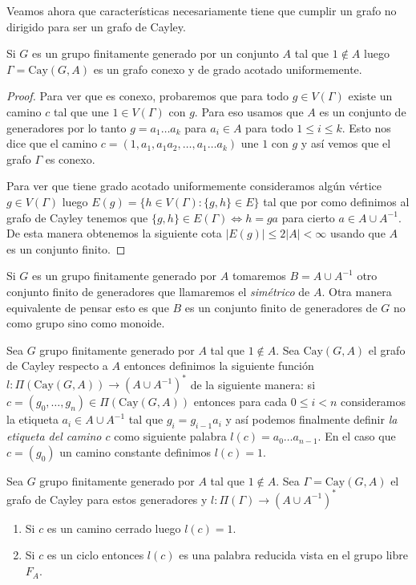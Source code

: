 \documentclass[tesis.tex]{subfiles}
\begin{document}
Veamos ahora que características necesariamente tiene que cumplir un grafo no dirigido para ser un grafo de Cayley.

\begin{lema}\label{lema_cayley_conexo_grado}
	Si $G$ es un grupo finitamente generado por un conjunto $A$ tal que $1 \notin A$ luego $\Gamma = \text{Cay}(G,A)$ es un grafo conexo y de grado acotado uniformemente.
\end{lema}
\begin{proof}
	Para ver que es conexo,	probaremos que para todo $g \in V(\Gamma)$ existe un camino $c$ tal que une $1 \in V(\Gamma)$ con $g$.
	Para eso usamos que $A$ es un conjunto de generadores por lo tanto $g = a_{1} \dots a_{k}$ para $a_{i} \in A$ para todo $1 \le i \le k$.
	Esto nos dice que el camino $c = (1, a_{1}, a_{1}a_{2}, \dots, a_{1} \dots a_{k})$ une $1$ con $g$ y así vemos que el grafo $\Gamma$ es conexo. 
	
	Para ver que tiene grado acotado uniformemente consideramos algún vértice $g \in V(\Gamma)$ luego $E(g) = \{  h \in V(\Gamma) : \{g,h\} \in E \}$ tal que por como definimos al grafo de Cayley tenemos que $\{g,h\} \in E(\Gamma) \iff h = ga$ para cierto $a \in A \cup A^{-1}$.
	De esta manera obtenemos la siguiente cota  $|E(g)| \le 2|A| < \infty$ usando que $A$ es un conjunto finito.
\end{proof}

Si $G$ es un grupo finitamente generado por $A$ tomaremos $B = A \cup A^{-1}$ otro conjunto finito de generadores que llamaremos el \emph{simétrico} de $A$.
Otra manera equivalente de pensar esto es que $B$ es un conjunto finito de generadores de $G$ no como grupo sino como monoide.

\begin{deff}
	Sea $G$ grupo finitamente generado por $A$ tal que $1 \notin A$.
	Sea $\text{Cay}(G,A)$ el grafo de Cayley respecto a $A$ entonces definimos la siguiente función 
	$l: \Pi(\text{Cay}(G,A)) \to (A \cup A^{-1})^*$
	de la siguiente manera:
	si $c = (g_{0}, \dots, g_{n}) \in \Pi(\text{Cay}(G,A))$ entonces para cada $0 \le i < n$ consideramos la etiqueta $a_{i} \in A \cup A^{-1}$ tal que $g_{i} = g_{i-1}a_{i}$ y así podemos finalmente definir \emph{la etiqueta del camino $c$} como siguiente palabra 
	$l(c) = a_{0}\dots a_{n-1}$.
	En el caso que $c = (g_{0})$ un camino constante definimos $l(c) = 1$. 
\end{deff}
\begin{lema}\label{obs_grafo_Cayley_palabras}
	Sea $G$ grupo finitamente generado por $A$ tal que $1 \notin A$.
	Sea $\Gamma = \text{Cay}(G,A)$ el grafo de Cayley para estos generadores y $l: \Pi(\Gamma) \to (A \cup A^{-1})^*$ 
	\begin{enumerate}
		\item Si $c$ es un camino cerrado luego $l(c) = 1$.
		
		\item Si $c$ es un ciclo entonces $l(c)$ es una palabra reducida vista en el grupo libre $F_{A}$.
	\end{enumerate}
\end{lema}
\end{document}
